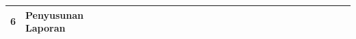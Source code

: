 \begin{table}[h!]
\begin{tabular}{|c|m{3.5cm}|*{24}{c|}}
6 &
Penyusunan Laporan &
{} & {} & {} & {} &
\cellcolor{blue!25} & \cellcolor{blue!25} & \cellcolor{blue!25} & \cellcolor{blue!25} &
\cellcolor{blue!25} & \cellcolor{blue!25} & \cellcolor{blue!25} & \cellcolor{blue!25} &
\cellcolor{blue!25} & \cellcolor{blue!25} & \cellcolor{blue!25} & \cellcolor{blue!25} &
\cellcolor{blue!25} & \cellcolor{blue!25} & \cellcolor{blue!25} & \cellcolor{blue!25} &
\cellcolor{blue!25} & \cellcolor{blue!25} & \cellcolor{blue!25} & \cellcolor{blue!25} \\
\hline

\end{tabular}

\end{table}

\newpage